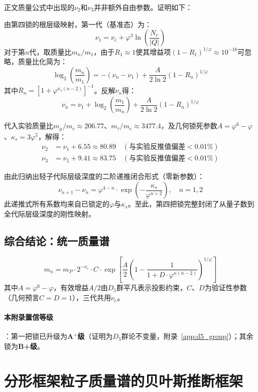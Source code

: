 \documentclass[12pt,a4paper,twocolumn]{article}
\renewcommand{\phi}{\varphi}
\begin{document}
正文质量公式中出现的$\nu_2$和$\nu_3$并非额外自由参数。证明如下：

由第四锁的根层级映射，第一代（基准态）为：
\[
\nu_1 = \nu_e + \phi^3 \ln\left(\frac{N_c}{|Q|}\right)
\]
对于第$n$代，取质量比$m_n/m_1$，由于$R_1 \approx 1$使其增益项$(1-R_1)^{1/\phi} \approx 10^{-18}$可忽略，质量比化简为：
\[
\log_2\left(\frac{m_n}{m_1}\right) = -(\nu_n - \nu_1) + \frac{A}{2\ln 2}(1-R_n)^{1/\phi}
\]
其中$R_n = [1 + \phi^{\kappa_s(n-2)}]^{-1}$。反解$\nu_n$得：
\[
\nu_n = \nu_1 + \log_2\left(\frac{m_1}{m_n}\right) + \frac{A}{2\ln 2}(1-R_n)^{1/\phi}
\]

代入实验质量比$m_\mu/m_e \approx 206.77$、$m_\tau/m_e \approx 3477.4$，及几何锁死参数$A=\phi^6-\phi$、$\kappa_s=3\phi^5$，解得：
\begin{align}
\nu_2 &= \nu_1 + 6.55 \approx 80.89 \quad (\text{与实验反推值偏差} < 0.01\%) \\
\nu_3 &= \nu_1 + 9.41 \approx 83.75 \quad (\text{与实验反推值偏差} < 0.01\%)
\end{align}

由此归纳出轻子代际层级深度的二阶递推闭合形式（零新参数）：
\begin{equation}
\nu_{n+1} - \nu_n = \phi^{4-n} \cdot \exp\left(-\frac{\kappa_s}{\phi^{n+2}}\right), \quad n=1,2
\label{eq:nu_recursive}
\end{equation}
此递推式所有系数均来自已锁定的$\phi$与$\kappa_s$。至此，第四把锁完整封闭了从量子数到全代际层级深度的刚性映射。

\subsection{综合结论：统一质量谱}
\[
\boxed{
m_n = m_P \cdot 2^{-\nu_e} \cdot C \cdot \exp\left[\frac{A}{2}\left(1-\frac{1}{1+D\cdot\phi^{\kappa(n-2)}}\right)^{1/\phi}\right]
}
\]
其中$A=\phi^6-\phi$，有效增益$A/2$由$D_5$群平凡表示投影约束，$C$、$D$为验证性参数（几何预言$C=D=1$），三代共用$\nu_e$。

\paragraph{本附录置信等级}：第一把锁已升级为\textbf{A$^+$级}（证明为$D_5$群论不变量，附录~\ref{app:d5_group}）；其余锁为\textbf{B+级}。

\section{分形框架粒子质量谱的贝叶斯推断框架}
\label{app:bayesian}
\end{document}
